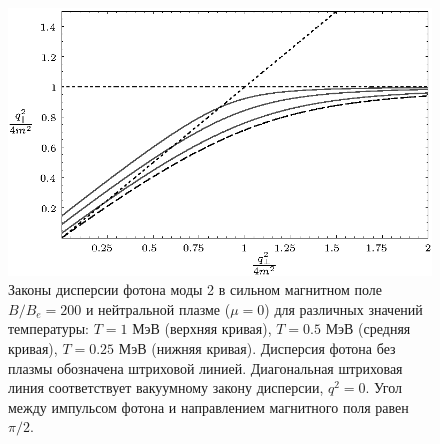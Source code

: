 %

\begin{figure}[t!]
	\centerline{\includegraphics[width = 15cm]{fig2_1.eps}}
	\vspace*{-2mm} \caption{Законы дисперсии фотона моды 2 в сильном магнитном поле  $B/B_e = 200$  
		и нейтральной плазме ($\mu=0$) для различных значений температуры:  $T = 1$ МэВ 
		(верхняя кривая), $T = 0.5$ МэВ (средняя кривая), $T = 0.25$ МэВ (нижняя кривая). 
		Дисперсия фотона без плазмы обозначена штриховой линией.
		Диагональная штриховая линия соответствует вакуумному закону дисперсии, $q^2 = 0$. Угол
		между импульсом фотона  и направлением  магнитного поля равен 
		$\pi/2$. } 
	\label{fig:disT}
\end{figure}

